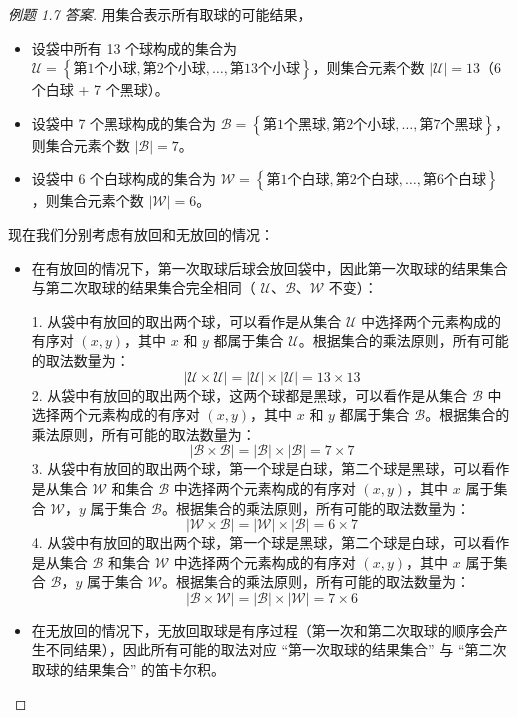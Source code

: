 \documentclass[lang=cn,math=mtpro2,11pt,scheme=chinese,pad]{elegantbook}
\begin{document}
\begin{proof}[例题 1.7 答案]
  用集合表示所有取球的可能结果，
  \begin{itemize}
    \item 设袋中所有 13 个球构成的集合为 \(\mathcal{U}=\left\{ \text{第1个小球}, \text{第2个小球}, \dots, \text{第13个小球} \right\}\)，则集合元素个数 \(|\mathcal{U}|=13\)（6 个白球 + 7 个黑球）。
    \item 设袋中 7 个黑球构成的集合为 \(\mathcal{B}=\left\{ \text{第1个黑球}, \text{第2个小球}, \dots, \text{第7个黑球} \right\}\)，则集合元素个数 \(|\mathcal{B}|=7\)。
    \item 设袋中 6 个白球构成的集合为 \(\mathcal{W}=\left\{ \text{第1个白球}, \text{第2个白球}, \dots, \text{第6个白球} \right\}\)，则集合元素个数 \(|\mathcal{W}|=6\)。
  \end{itemize}

  现在我们分别考虑有放回和无放回的情况：

  \begin{itemize}
    \item 在有放回的情况下，第一次取球后球会放回袋中，因此第一次取球的结果集合与第二次取球的结果集合完全相同（ \(\mathcal{U}\)、\(\mathcal{B}\)、\(\mathcal{W}\) 不变）：
    
  1. 从袋中有放回的取出两个球，可以看作是从集合 \(\mathcal{U}\) 中选择两个元素构成的有序对 \((x,y)\)，其中 \(x\) 和 \(y\) 都属于集合 \(\mathcal{U}\)。根据集合的乘法原则，所有可能的取法数量为：
  \[
    |\mathcal{U} \times \mathcal{U}| = |\mathcal{U}| \times |\mathcal{U}| = 13 \times 13
  \]
  2. 从袋中有放回的取出两个球，这两个球都是黑球，可以看作是从集合 \(\mathcal{B}\) 中选择两个元素构成的有序对 \((x,y)\)，其中 \(x\) 和 \(y\) 都属于集合 \(\mathcal{B}\)。根据集合的乘法原则，所有可能的取法数量为：
  \[
    |\mathcal{B} \times \mathcal{B}| = |\mathcal{B}| \times |\mathcal{B}| = 7 \times 7
  \]
  3. 从袋中有放回的取出两个球，第一个球是白球，第二个球是黑球，可以看作是从集合 \(\mathcal{W}\) 和集合 \(\mathcal{B}\) 中选择两个元素构成的有序对 \((x,y)\)，其中 \(x\) 属于集合 \(\mathcal{W}\)，\(y\) 属于集合 \(\mathcal{B}\)。根据集合的乘法原则，所有可能的取法数量为：
  \[
    |\mathcal{W} \times \mathcal{B}| = |\mathcal{W}| \times |\mathcal{B}| = 6 \times 7
  \]
  4. 从袋中有放回的取出两个球，第一个球是黑球，第二个球是白球，可以看作是从集合 \(\mathcal{B}\) 和集合 \(\mathcal{W}\) 中选择两个元素构成的有序对 \((x,y)\)，其中 \(x\) 属于集合 \(\mathcal{B}\)，\(y\) 属于集合 \(\mathcal{W}\)。根据集合的乘法原则，所有可能的取法数量为：
  \[
    |\mathcal{B} \times \mathcal{W}| = |\mathcal{B}| \times |\mathcal{W}| = 7 \times 6
  \]
  \item 在无放回的情况下，无放回取球是有序过程（第一次和第二次取球的顺序会产生不同结果），因此所有可能的取法对应 “第一次取球的结果集合” 与 “第二次取球的结果集合” 的笛卡尔积。
  

\end{itemize}
\end{proof}
\end{document}
